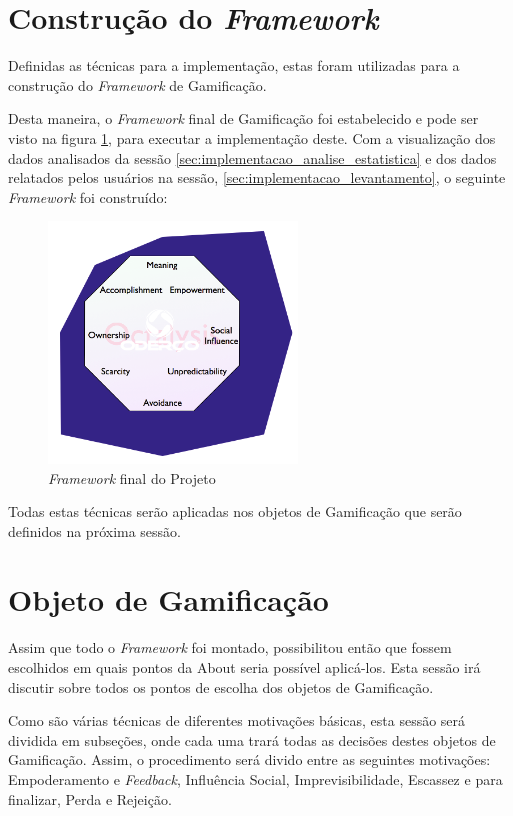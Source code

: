 \section{Construção do \textit{Framework}}
\label{sec:gamifição}
Definidas as técnicas para a implementação, estas foram utilizadas para a construção do \textit{Framework}
de Gamificação.

Desta maneira, o \textit{Framework} final de Gamificação foi estabelecido e pode ser visto
na figura \ref{fig:final_project_octalisys}, para executar a implementação
deste. Com a visualização dos dados analisados da sessão \ref{sec:implementacao_analise_estatistica}
e dos dados relatados pelos usuários na sessão, \ref{sec:implementacao_levantamento}, o seguinte \textit{Framework}
foi construído:

\begin{figure}[h]
    \centering

    \includegraphics[width=250px, scale=1]{figuras/final_framework}
    \caption{\textit{Framework} final do Projeto}

    \label{fig:final_project_octalisys}
\end{figure}

Todas estas técnicas serão aplicadas nos objetos de Gamificação que  serão definidos na próxima sessão.

\section{Objeto de Gamificação}
\label{sec:implementacao_objeto_gamificao}
Assim que todo o \textit{Framework} foi montado, possibilitou então que fossem escolhidos em quais
pontos da About seria possível aplicá-los. Esta sessão irá discutir sobre todos os pontos de escolha
dos objetos de Gamificação.

Como são várias técnicas de diferentes motivações básicas, esta sessão será dividida em subseções, onde
cada uma trará todas as decisões destes objetos de Gamificação. Assim, o procedimento será divido entre
as seguintes motivações: Empoderamento e \textit{Feedback}, Influência Social, Imprevisibilidade,
Escassez e para finalizar,  Perda e Rejeição.

